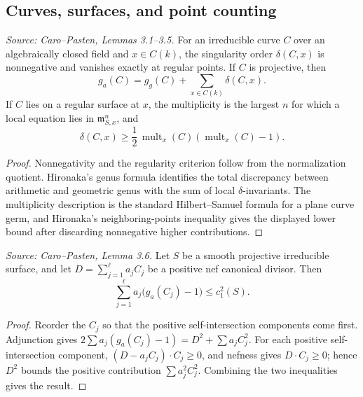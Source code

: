 \subsection{Curves, surfaces, and point counting}

\begin{lemma}
  \label{lem:cp_curve_singularity_package}
  \textit{Source: Caro--Pasten, Lemmas 3.1--3.5.}
  For an irreducible curve \(C\) over an algebraically closed field and
  \(x\in C(k)\), the singularity order \(\delta(C,x)\) is nonnegative and
  vanishes exactly at regular points.  If \(C\) is projective, then
  \[
    g_a(C)=g_g(C)+\sum_{x\in C(k)}\delta(C,x).
  \]
  If \(C\) lies on a regular surface at \(x\), the multiplicity is the largest
  \(n\) for which a local equation lies in \(\mathfrak m_{S,x}^n\), and
  \[
    \delta(C,x)\ge \frac12\,\operatorname{mult}_x(C)
      (\operatorname{mult}_x(C)-1).
  \]
\end{lemma}
\begin{proof}
  Nonnegativity and the regularity criterion follow from the normalization
  quotient.  Hironaka's genus formula identifies the total discrepancy between
  arithmetic and geometric genus with the sum of local \(\delta\)-invariants.
  The multiplicity description is the standard Hilbert--Samuel formula for a
  plane curve germ, and Hironaka's neighboring-points inequality gives the
  displayed lower bound after discarding nonnegative higher contributions.
\end{proof}

\begin{lemma}
  \label{lem:cp_canonical_genus_bound}
  \textit{Source: Caro--Pasten, Lemma 3.6.}
  Let \(S\) be a smooth projective irreducible surface, and let
  \(D=\sum_{j=1}^{\ell}a_jC_j\) be a positive nef canonical divisor.  Then
  \[
    \sum_{j=1}^{\ell}a_j\bigl(g_a(C_j)-1\bigr)\le c_1^2(S).
  \]
\end{lemma}
\begin{proof}
  Reorder the \(C_j\) so that the positive self-intersection components come
  first.  Adjunction gives
  \(2\sum a_j(g_a(C_j)-1)=D^2+\sum a_j C_j^2\).  For each positive
  self-intersection component, \((D-a_jC_j)\cdot C_j\ge0\), and nefness gives
  \(D\cdot C_j\ge0\); hence \(D^2\) bounds the positive contribution
  \(\sum a_j^2 C_j^2\).  Combining the two inequalities gives the result.
\end{proof}

